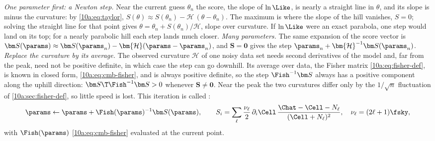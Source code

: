 \emph{One parameter first: a Newton step.} Near the current guess $\theta_n$ the score, the slope of $\ln\Like$, is
nearly a straight line in $\theta$, and its slope is minus the curvature: by \eqref{10a:eq:taylor},
$S(\theta)\approx S(\theta_n)-\mathcal H\,(\theta-\theta_n)$. The maximum is where the slope of the hill vanishes, $S=0$; solving the
straight line for that point gives $\theta=\theta_n+S(\theta_n)/\mathcal H$, slope over curvature. If $\ln\Like$ were an exact
parabola, one step would land on its top; for a nearly parabolic hill each step lands much closer.
\emph{Many parameters.} The same expansion of the score vector is $\bm S(\params)\approx\bm S(\params_n)-\bm{\mathcal H}(\params-\params_n)$, and
$\bm S=\bm0$ gives the step $\params_n+\bm{\mathcal H}^{-1}\bm S(\params_n)$. \emph{Replace the curvature by its average.} The observed
curvature $\bm{\mathcal H}$ of one noisy data set needs second derivatives of the model and, far from the peak, need not
be positive definite, in which case the step can go downhill. Its average over data, the Fisher matrix
\eqref{10a:eq:fisher-def}, is known in closed form, \eqref{10a:eq:cmb-fisher}, and is always positive definite, so the
step $\Fish^{-1}\bm S$ always has a positive component along the uphill direction: $\bm S\T\Fish^{-1}\bm S>0$ whenever
$\bm S\neq\bm0$. Near the peak the two curvatures differ only by the $1/\sqrt n$ fluctuation of
\cref{10a:sec:fisher-def}, so little speed is lost. This iteration is called :
\begin{equation}
  \params\leftarrow\params+\Fish(\params)^{-1}\bm S(\params),
  \qquad
  S_i=\sum_\ell\frac{\nu_\ell}2\,\partial_i\Cell\,\frac{\Chat-\Cell-N_\ell}{(\Cell+N_\ell)^2},
  \quad\nu_\ell=(2\ell+1)\fsky,
  \label{10a:eq:scoring}
\end{equation}
with $\Fish(\params)$ \eqref{10a:eq:cmb-fisher} evaluated at the current point.

